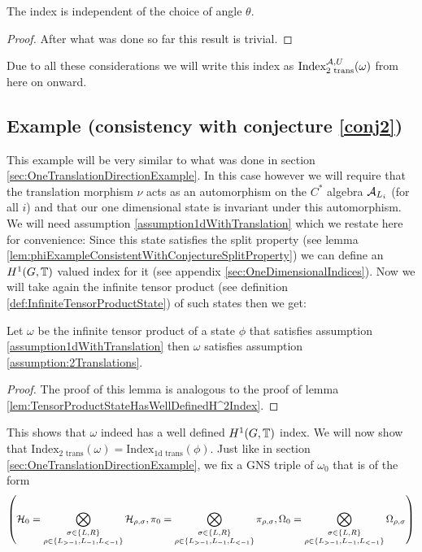 \documentclass[12pt,a4paper,twoside]{article}
\numberwithin{equation}{section}
\begin{document}
\begin{lemma}
	The index is independent of the choice of angle $\theta$.
\end{lemma}
\begin{proof}
	After what was done so far this result is trivial.
\end{proof}
Due to all these considerations we will write this index as $\textrm{Index}_{2\text{ trans}}^{\AA,U}(\omega)$ from here on onward.
\subsection{Example (consistency with conjecture \ref{conj2})}\label{sec:TwoTranslationDirectionsExample}
This example will be very similar to what was done in section \ref{sec:OneTranslationDirectionExample}. In this case however we will require that the translation morphism $\nu$ acts as an automorphism on the $C^*$ algebra $\AA_{L_i}$ (for all $i$) and that our one dimensional state is invariant under this automorphism. We will need assumption \ref{assumption1dWithTranslation} which we restate here for convenience:
\assumptionOneDimensionalTwo*
Since this state satisfies the split property (see lemma \ref{lem:phiExampleConsistentWithConjectureSplitProperty}) we can define an $H^1(G,\TT)$ valued index for it (see appendix \ref{sec:OneDimensionalIndices}). Now we will take again the infinite tensor product (see definition \ref{def:InfiniteTensorProductState}) of such states then we get:
\begin{lemma}
	Let $\omega$ be the infinite tensor product of a state $\phi$ that satisfies assumption \ref{assumption1dWithTranslation} then $\omega$ satisfies assumption \ref{assumption:2Translations}.
\end{lemma}
\begin{proof}
	The proof of this lemma is analogous to the proof of lemma \ref{lem:TensorProductStateHasWellDefinedH^2Index}.
\end{proof}
This shows that $\omega$ indeed has a well defined $H^1(G,\TT)$ index. We will now show that $\textrm{Index}_{\text{2 trans}}(\omega)=\textrm{Index}_{\text{1d trans}}(\phi)$. Just like in section \ref{sec:OneTranslationDirectionExample}, we fix a GNS triple of $\omega_0$ that is of the form
\begin{equation}
	\left(\HH_0=\bigotimes_{\substack{\sigma\in\{L,R\}\\ \rho\in\{L_{>-1},L_{-1},L_{<-1}\}}}\HH_{\rho,\sigma},\pi_0=\bigotimes_{\substack{\sigma\in\{L,R\}\\ \rho\in\{L_{>-1},L_{-1},L_{<-1}\}}}\pi_{\rho,\sigma},\Omega_0=\bigotimes_{\substack{\sigma\in\{L,R\}\\ \rho\in\{L_{>-1},L_{-1},L_{<-1}\}}}\Omega_{\rho,\sigma}\right)
\end{equation}
\end{document}
